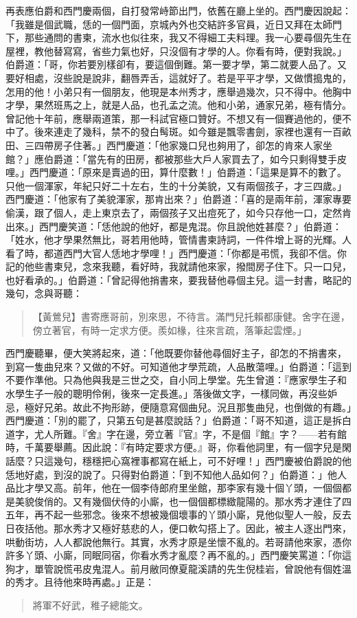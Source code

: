 再表應伯爵和西門慶兩個，自打發常峙節出門，依舊在廳上坐的。西門慶因說起：「我雖是個武職，恁的一個門面，京城內外也交結許多官員，近日又拜在太師門下，那些通問的書柬，流水也似往來，我又不得細工夫料理。我一心要尋個先生在屋裡，教他替寫寫，省些力氣也好，只沒個有才學的人。你看有時，便對我說。」伯爵道：「哥，你若要別樣卻有，要這個倒難。第一要才學，第二就要人品了。又要好相處，沒些說是說非，翻唇弄舌，這就好了。若是平平才學，又做慣搗鬼的，怎用的他！小弟只有一個朋友，他現是本州秀才，應舉過幾次，只不得中。他胸中才學，果然班馬之上，就是人品，也孔孟之流。他和小弟，通家兄弟，極有情分。曾記他十年前，應舉兩道策，那一科試官極口贊好。不想又有一個賽過他的，便不中了。後來連走了幾科，禁不的發白髩斑。如今雖是飄零書劍，家裡也還有一百畝田、三四帶房子住著。」西門慶道：「他家幾口兒也夠用了，卻怎的肯來人家坐館？」應伯爵道：「當先有的田房，都被那些大戶人家買去了，如今只剩得雙手皮哩。」西門慶道：「原來是賣過的田，算什麼數！」伯爵道：「這果是算不的數了。只他一個渾家，年紀只好二十左右，生的十分美貌，又有兩個孩子，才三四歲。」西門慶道：「他家有了美貌渾家，那肯出來？」伯爵道：「喜的是兩年前，渾家專要偷漢，跟了個人，走上東京去了，兩個孩子又出痘死了，如今只存他一口，定然肯出來。」西門慶笑道：「恁他說的他好，都是鬼混。你且說他姓甚麼？」伯爵道：「姓水，他才學果然無比，哥若用他時，管情書柬詩詞，一件件增上哥的光輝。人看了時，都道西門大官人恁地才學哩！」西門慶道：「你都是弔慌，我卻不信。你記的他些書柬兒，念來我聽，看好時，我就請他來家，撥間房子住下。只一口兒，也好看承的。」伯爵道：「曾記得他捎書來，要我替他尋個主兒。這一封書，略記的幾句，念與哥聽：
\begin{quote}
【黃鶯兒】書寄應哥前，別來思，不待言。滿門兒托賴都康健。舍字在邊，傍立著官，有時一定求方便。羨如椽，往來言疏，落筆起雲煙。」
\end{quote}

西門慶聽畢，便大笑將起來，道：「他既要你替他尋個好主子，卻怎的不捎書來，到寫一隻曲兒來？又做的不好。可知道他才學荒疏，人品散蕩哩。」伯爵道：「這到不要作準他。只為他與我是三世之交，自小同上學堂。先生曾道：『應家學生子和水學生子一般的聰明伶俐，後來一定長進。」落後做文字，一樣同做，再沒些妒忌，極好兄弟。故此不拘形跡，便隨意寫個曲兒。況且那隻曲兒，也倒做的有趣。」西門慶道：「別的罷了，只第五句是甚麼說話？」伯爵道：「哥不知道，這正是拆白道字，尤人所難。『舍』字在邊，旁立著『官』字，不是個『館』字？——若有館時，千萬要舉薦。因此說：『有時定要求方便。』哥，你看他詞里，有一個字兒是閑話麼？只這幾句，穩穩把心窩裡事都寫在紙上，可不好哩！」西門慶被伯爵說的他恁地好處，到沒的說了。只得對伯爵道：「到不知他人品如何？」伯爵道：」他人品比才學又高。前年，他在一個李侍郎府里坐館，那李家有幾十個丫頭，一個個都是美貌俊俏的。又有幾個伏侍的小廝，也一個個都標緻龍陽的。那水秀才連住了四五年，再不起一些邪念。後來不想被幾個壞事的丫頭小廝，見他似聖人一般，反去日夜括他。那水秀才又極好慈悲的人，便口軟勾搭上了。因此，被主人逐出門來，哄動街坊，人人都說他無行。其實，水秀才原是坐懷不亂的。若哥請他來家，憑你許多丫頭、小廝，同眠同宿，你看水秀才亂麼？再不亂的。」西門慶笑罵道：「你這狗才，單管說慌弔皮鬼混人。前月敝同僚夏龍溪請的先生倪桂岩，曾說他有個姓溫的秀才。且待他來時再處。」正是：
\begin{quote}
將軍不好武，稚子總能文。
\end{quote}
